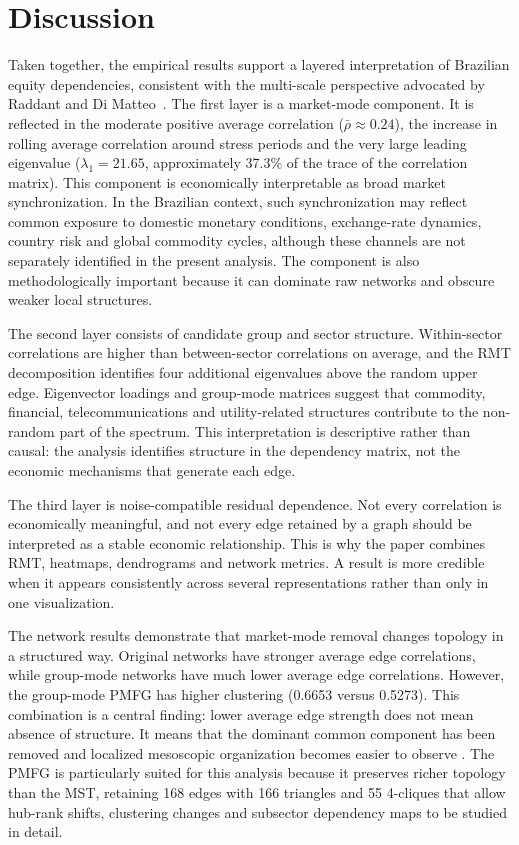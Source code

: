 \section{Discussion}
\label{sec:discussion}

Taken together, the empirical results support a layered interpretation of Brazilian equity dependencies, consistent with the multi-scale perspective advocated by Raddant and Di Matteo~\cite{raddant_dimatteo_2023}. The first layer is a market-mode component. It is reflected in the moderate positive average correlation ($\bar{\rho}\approx0.24$), the increase in rolling average correlation around stress periods and the very large leading eigenvalue ($\lambda_1=21.65$, approximately 37.3\% of the trace of the correlation matrix). This component is economically interpretable as broad market synchronization. In the Brazilian context, such synchronization may reflect common exposure to domestic monetary conditions, exchange-rate dynamics, country risk and global commodity cycles, although these channels are not separately identified in the present analysis. The component is also methodologically important because it can dominate raw networks and obscure weaker local structures.

The second layer consists of candidate group and sector structure. Within-sector correlations are higher than between-sector correlations on average, and the RMT decomposition identifies four additional eigenvalues above the random upper edge. Eigenvector loadings and group-mode matrices suggest that commodity, financial, telecommunications and utility-related structures contribute to the non-random part of the spectrum. This interpretation is descriptive rather than causal: the analysis identifies structure in the dependency matrix, not the economic mechanisms that generate each edge.

The third layer is noise-compatible residual dependence. Not every correlation is economically meaningful, and not every edge retained by a graph should be interpreted as a stable economic relationship. This is why the paper combines RMT, heatmaps, dendrograms and network metrics. A result is more credible when it appears consistently across several representations rather than only in one visualization.

The network results demonstrate that market-mode removal changes topology in a structured way. Original networks have stronger average edge correlations, while group-mode networks have much lower average edge correlations. However, the group-mode PMFG has higher clustering (0.6653 versus 0.5273). This combination is a central finding: lower average edge strength does not mean absence of structure. It means that the dominant common component has been removed and localized mesoscopic organization becomes easier to observe \cite{tumminello_2005_tool,tumminello_2010_correlation}. The PMFG is particularly suited for this analysis because it preserves richer topology than the MST, retaining 168 edges with 166 triangles and 55 4-cliques that allow hub-rank shifts, clustering changes and subsector dependency maps to be studied in detail.


